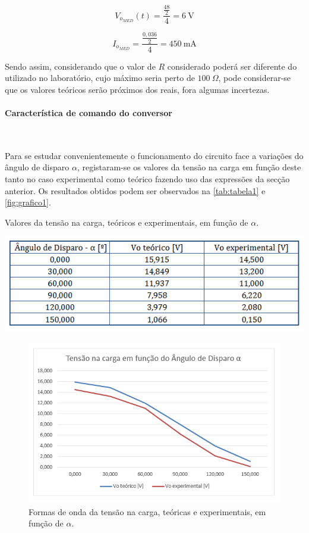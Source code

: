 \documentclass[a4paper,11pt]{article}
\numberwithin{equation}{section}
\begin{document}
\[V_{o_{MED}} (t) = \frac{\frac{48}{2}}{4} = 6~\text{V}\]

\[I_{o_{MED}}= \frac{\frac{0,036}{2}}{4} = 450~\text{mA}\]

Sendo assim, considerando que o valor de $R$ considerado poderá ser diferente do utilizado no laboratório, cujo máximo seria perto de $100~\Omega$, pode considerar-se que os valores teóricos serão próximos dos reais, fora algumas incertezas.

\paragraph{Característica de comando do conversor}\mbox{}\

Para se estudar convenientemente o funcionamento do circuito face a variações do ângulo de disparo $\alpha$, registaram-se os valores da tensão na carga em função deste tanto no caso experimental como teórico fazendo uso das expressões da secção anterior. Os resultados obtidos podem ser observados na \autoref{tab:tabela1} e \autoref{fig:grafico1}. 

\begin{table}[!htb]
	\centering
	\caption{Valores da tensão na carga, teóricos e experimentais, em função de $\alpha$.}
	\vspace{-3mm}
	\includegraphics[width=0.8\linewidth]{teoricas/tabela1}
	\label{tab:tabela1}
\end{table}

\begin{figure}[H]
	\centering
	\includegraphics[keepaspectratio=true, scale=0.8]{teoricas/grafico1}
	\vspace{-3mm}
	\caption{Formas de onda da tensão na carga, teóricas e experimentais, em função de $\alpha$.}
	\label{fig:grafico1}
	\vspace{-0.8em}
\end{figure}
\end{document}
